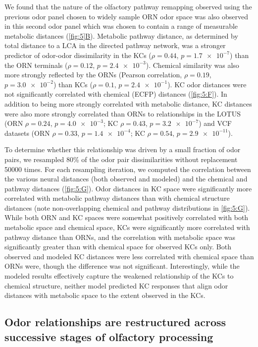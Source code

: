 \documentclass[12pt]{caltech_thesis}
\let\Oldsubsection\subsection
\renewcommand{\subsection}{\FloatBarrier\Oldsubsection}
\begin{document}
\begin{refsection}
We found that the nature of the olfactory pathway remapping observed using the previous odor panel chosen to widely sample ORN odor space was also observed in this second odor panel which was chosen to contain a range of measurable metabolic distances (\hyperref[fig:5:Bi]{\cref*{fig:5}B}).
Metabolic pathway distance, as determined by total distance to a LCA in the directed pathway network, was a stronger predictor of odor-odor dissimilarity in the KCs ($\rho {=}0.44$, $p{=}\num{1.7e-7}$) than the ORN terminals ($\rho {=}0.12$, $p{=}\num{2.4e-3}$).
Chemical similarity was also more strongly reflected by the ORNs (Pearson correlation, $\rho {=}0.19$, $p{=}\num{3.0e-2}$) than KCs ($\rho {=}0.1$, $p{=}\num{2.4e-1}$).
KC odor distances were not significantly correlated with chemical (ECFP) distances (\cref{fig:5:F}).
In addition to being more strongly correlated with metabolic distance, KC distances were also more strongly correlated than ORNs to relationships in the LOTUS (ORN $\rho {=}0.24$, $p{=}\num{4.0e-3}$; KC $\rho {=}0.43$, $p{=}\num{3.2e-7}$) and VCF datasets (ORN $\rho {=}0.33$, $p{=}\num{1.4e-4}$; KC $\rho {=}0.54$, $p{=}\num{2.9e-11}$).

To determine whether this relationship was driven by a small fraction of odor pairs, we resampled 80\% of the odor pair dissimilarities without replacement \num{50000} times.
For each resampling iteration, we computed the correlation between the various neural distances (both observed and modeled) and the chemical and pathway distances (\cref{fig:5:G}).
Odor distances in KC space were significantly more correlated with metabolic pathway distances than with chemical structure distances (note non-overlapping chemical and pathway distributions in \cref{fig:5:G}).
While both ORN and KC spaces were somewhat positively correlated with both metabolic space and chemical space, KCs were significantly more correlated with pathway distance than ORNs, and the correlation with metabolic space was significantly greater than with chemical space for observed KCs only.
Both observed and modeled KC distances were less correlated with chemical space than ORNs were, though the difference was not significant.
Interestingly, while the modeled results effectively capture the weakened relationship of the KCs to chemical structure, neither model predicted KC responses that align odor distances with metabolic space to the extent observed in the KCs.


\subsection{Odor relationships are restructured across successive stages of olfactory processing}


\end{refsection}
\end{document}
